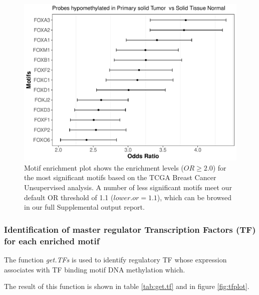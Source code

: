 

\begin{figure}
\centering
\includegraphics[width=1.0\textwidth]{images/motif_new.pdf}
\caption{\label{fig:motifplot} Motif enrichment plot shows the enrichment levels ($OR\geq2.0$) for the most significant motifs based on the TCGA Breast Cancer Unsupervised analysis. A number of less significant motifs meet our default OR threshold of 1.1 ($\textit{lower.or}=1.1$), which can be browsed in our full Supplemental output report.}
\end{figure}

\subsubsection*{Identification of master regulator Transcription Factors (TF) for each enriched motif}
The function \textit{get.TFs} is used to identify regulatory TF whose expression associates with TF binding motif
DNA methylation which.



The result of this function is shown in table \ref{tab:get.tf} and in figure \ref{fig:tfplot}.

